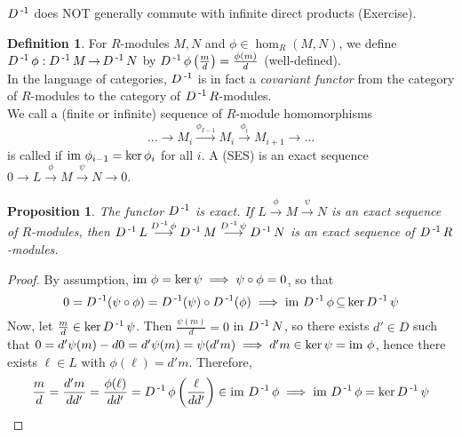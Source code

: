 \documentclass[11pt]{book}
\newcounter{counter}
\newtheorem{proposition}[counter]{Proposition}   \newtheorem{problem}[counter]{Problem}   \newtheorem*{proposition*}{Proposition}   \newtheorem*{lemma*}{Lemma}
\theoremstyle{definition}   \newtheorem{defn}[counter]{Definition} %
\newcommand{\mses}[5]{0 \longrightarrow #1 \overset{#2}{\longrightarrow} #3 \overset{#4}{\longrightarrow} #5 \longrightarrow 0}
\DeclareMathOperator{\ra}{\rightarrow}   \DeclareMathOperator{\Poly}{\mathbf{P}}   \DeclareMathOperator{\spn}{\textnormal{span}}   \DeclareMathOperator{\aut}{\textnormal{Aut}}
\newcommand{\vs}{\vspace{8pt}}   \newcommand{\hs}{\hspace{8pt}}
\numberwithin{counter}{chapter}
\begin{document}
\vs

\begin{remark}
$D\operatorname{^{-1}}$ does NOT generally commute with infinite direct products (Exercise).
\end{remark}

\vs

\begin{defn}
For $R$-modules $M,N$ and $\phi \in \hom_R(M,N)$, we define $D\inv \phi : D\inv M \ra D\inv N$ by $D\operatorname{^{-1}}\phi \left(\frac{m}{d}\right) = \frac{\phi(m)}{d}$ (well-defined). \\

In the language of categories, $D\operatorname{^{-1}}$ is in fact a \emph{covariant functor} from the category of $R$-modules to the category of $D\operatorname{^{-1}} R$-modules. \\

We call a (finite or infinite) sequence of $R$-module homomorphisms
\[...\longrightarrow M_i \overset{\phi_{I-1}}{\longrightarrow} M_i \overset{\phi_i}{\longrightarrow} M_{i+1} \longrightarrow \dots \]
is called  if $\textnormal{im } \phi_{i-1} = \ker \phi_i$ for all $i$. A  (SES) is an exact sequence \\ $\mses{L}{\phi}{M}{\psi}{N}$.
\end{defn}

\vs

\begin{proposition}
The functor $D\operatorname{^{-1}}$ is exact. If $L \overset{\phi}{\longrightarrow} M \overset{\psi}{\longrightarrow} N$ is an exact sequence of $R$-modules, then $D\operatorname{^{-1}} L \overset{D\operatorname{^{-1}} \phi}{\longrightarrow} D\operatorname{^{-1}} M \overset{D\operatorname{^{-1}} \psi}{\longrightarrow} D\operatorname{^{-1}} N$ is an exact sequence of $D\operatorname{^{-1}} R$-modules.
\end{proposition}

\begin{proof}
By assumption, $\textnormal{im } \phi = \ker \psi \implies \psi \circ \phi = 0$, so that
	\[0 = D\operatorname{^{-1}}(\psi \circ \phi) = D\operatorname{^{-1}}(\psi) \circ D\operatorname{^{-1}}(\phi) \implies \textnormal{im } D\operatorname{^{-1}} \phi \operatorname{\subseteq} \ker D\operatorname{^{-1}} \psi \]
Now, let $\frac{m}{d} \in \ker D\operatorname{^{-1}} \psi$. Then $\frac{\psi(m)}{d} = 0$ in $D\operatorname{^{-1}} N$, so there exists $d' \in D$ such that $0 = d'\psi(m) - d0 = d'\psi(m) = \psi(d'm) \implies d'm \in \ker \psi = \textnormal{im } \phi$, hence there exists $\ell \in L$ with $\phi(\ell) = d'm$. Therefore,
	\[\frac{m}{d} = \frac{d'm}{dd'} = \frac{\phi(\ell)}{dd'} = D\operatorname{^{-1}} \phi \left(\frac{\ell}{dd'} \right) \in \textnormal{im } D\operatorname{^{-1}} \phi \implies \textnormal{im } D\operatorname{^{-1}} \phi = \ker D\operatorname{^{-1}} \psi \]
\end{proof}
\end{document}

